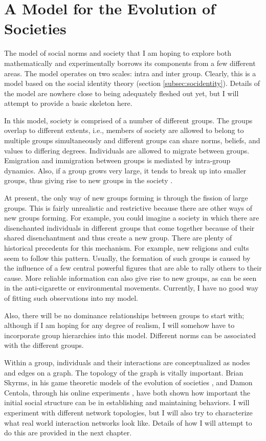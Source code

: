 \documentclass[rutwik_proposal.tex]{subfiles}
\begin{document}
\chapter{A Model for the Evolution of Societies}\label{ch:models}

The model of social norms and society that I am hoping to explore both mathematically and experimentally borrows its components from a few different areas. The model operates on two scales: intra and inter group. Clearly, this is a model based on the social identity theory (section \ref{subsec:socidentity}). Details of the model are nowhere close to being adequately fleshed out yet, but I will attempt to provide a basic skeleton here.

In this model, society is comprised of a number of different groups. The groups overlap to different extents, i.e., members of society are allowed to belong to multiple groups simultaneously and different groups can share norms, beliefs, and values to differing degrees. Individuals are allowed to migrate between groups. Emigration and immigration between groups is mediated by intra-group dynamics. Also, if a group grows very large, it tends to break up into smaller groups, thus giving rise to new groups in the society \cite{Mullen92}.

At present, the only way of new groups forming is through the fission of large groups. This is fairly unrealistic and restrictive because there are other ways of new groups forming. For example, you could imagine a society in which there are disenchanted individuals in different groups that come together because of their shared disenchantment and thus create a new group. There are plenty of historical precedents for this mechanism. For example, new religions and cults seem to follow this pattern. Usually, the formation of such groups is caused by the influence of a few central powerful figures that are able to rally others to their cause. More reliable information can also give rise to new groups, as can be seen in the anti-cigarette or environmental movements. Currently, I have no good way of fitting such observations into my model.

Also, there will be no dominance relationships between groups to start with; although if I am hoping for any degree of realism, I will somehow have to incorporate group hierarchies into this model. Different norms can be associated with the different groups.

Within a group, individuals and their interactions are conceptualized as nodes and edges on a graph. The topology of the graph is vitally important. Brian Skyrms, in his game theoretic models of the evolution of societies \cite{Skyrms96, Skyrms04}, and Damon Centola, through his online experiments \cite{Centola10}, have both shown how important the initial social structure can be in establishing and maintaining behaviors. I will experiment with different network topologies, but I will also try to characterize what real world interaction networks look like. Details of how I will attempt to do this are provided in the next chapter.
\end{document}
